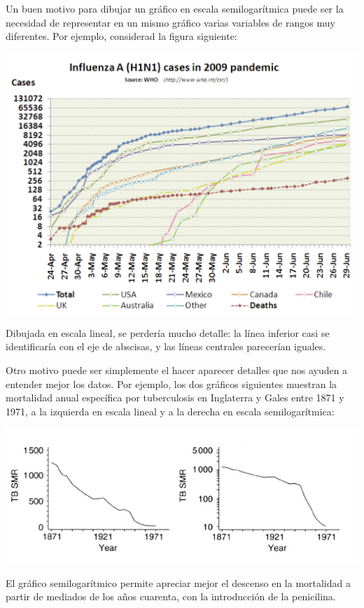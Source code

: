 \documentclass[
]{book}
\theoremstyle{definition}
\theoremstyle{definition}
\theoremstyle{definition}
\theoremstyle{definition}
\theoremstyle{remark}
\begin{document}
Un buen motivo para dibujar un gráfico en escala semilogarítmica puede ser la necesidad de representar en un mismo gráfico varias variables de rangos muy diferentes. Por ejemplo, considerad la figura siguiente:

\begin{center}\includegraphics[width=0.75\linewidth]{INREMDN_files/figure-html/h1n1} \end{center}

Dibujada en escala lineal, se perdería mucho detalle: la línea inferior casi se identificaría con el eje de abscisas, y las líneas centrales parecerían iguales.

Otro motivo puede ser simplemente el hacer aparecer detalles que nos ayuden a entender mejor los datos. Por ejemplo, los dos gráficos siguientes muestran la mortalidad anual específica por tuberculosis en Inglaterra y Gales entre 1871 y 1971, a la izquierda en escala lineal y a la derecha en escala semilogarítmica:

\begin{center}\includegraphics[width=0.9\linewidth]{INREMDN_files/figure-html/loglog3} \end{center}

El gráfico semilogarítmico permite apreciar mejor el descenso en la mortalidad a partir de mediados de los años cuarenta, con la introducción de la penicilina.
\end{document}
